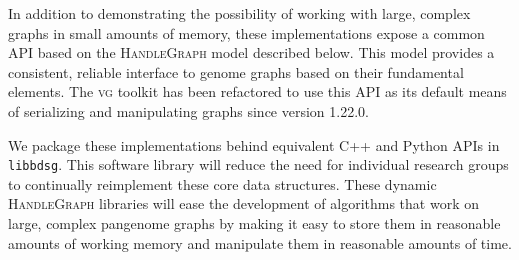 \documentclass{bioinfo}
\begin{document}
In addition to demonstrating the possibility of working with large, complex graphs in small amounts of memory, these implementations expose a common API based on the \textsc{HandleGraph} model described below.
This model provides a consistent, reliable interface to genome graphs based on their fundamental elements.
The \textsc{vg} toolkit has been refactored to use this API as its default means of serializing and manipulating graphs since version 1.22.0. 

We package these implementations behind equivalent C++ and Python APIs in \texttt{libbdsg}.
This software library will reduce the need for individual research groups to continually reimplement these core data structures.
These dynamic \textsc{HandleGraph} libraries will ease the development of algorithms that work on large, complex pangenome graphs by making it easy to store them in reasonable amounts of working memory and manipulate them in reasonable amounts of time.
\end{document}

